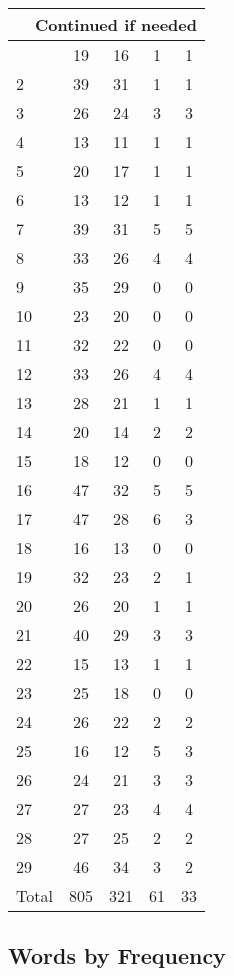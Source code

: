 \begin{center}
\begin{longtable}{l|c|c|c|c}
\hline \multicolumn{5}{|r|}{{Continued if needed}} \\ \hline
\endfoot 
1 & 19 & 16 & 1 & 1\\ \hline
2 & 39 & 31 & 1 & 1\\ \hline
3 & 26 & 24 & 3 & 3\\ \hline
4 & 13 & 11 & 1 & 1\\ \hline
5 & 20 & 17 & 1 & 1\\ \hline
6 & 13 & 12 & 1 & 1\\ \hline
7 & 39 & 31 & 5 & 5\\ \hline
8 & 33 & 26 & 4 & 4\\ \hline
9 & 35 & 29 & 0 & 0\\ \hline
10 & 23 & 20 & 0 & 0\\ \hline
11 & 32 & 22 & 0 & 0\\ \hline
12 & 33 & 26 & 4 & 4\\ \hline
13 & 28 & 21 & 1 & 1\\ \hline
14 & 20 & 14 & 2 & 2\\ \hline
15 & 18 & 12 & 0 & 0\\ \hline
16 & 47 & 32 & 5 & 5\\ \hline
17 & 47 & 28 & 6 & 3\\ \hline
18 & 16 & 13 & 0 & 0\\ \hline
19 & 32 & 23 & 2 & 1\\ \hline
20 & 26 & 20 & 1 & 1\\ \hline
21 & 40 & 29 & 3 & 3\\ \hline
22 & 15 & 13 & 1 & 1\\ \hline
23 & 25 & 18 & 0 & 0\\ \hline
24 & 26 & 22 & 2 & 2\\ \hline
25 & 16 & 12 & 5 & 3\\ \hline
26 & 24 & 21 & 3 & 3\\ \hline
27 & 27 & 23 & 4 & 4\\ \hline
28 & 27 & 25 & 2 & 2\\ \hline
29 & 46 & 34 & 3 & 2\\ \hline
\hline \hline
Total & 805 & 321 & 61 & 33



\end{longtable}
\end{center}

 
\subsection{Words by Frequency}

